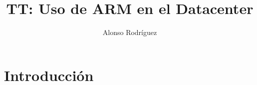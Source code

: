 \documentclass[a4paper,openright,12pt]{article}
\begin{document}
\author {Alonso Rodríguez}
\title {TT: Uso de ARM en el Datacenter}

\maketitle

\justifying{}

\section{Introducción}


\clearpage
\begin{flushleft}
\printbibliography[]{}
\end{flushleft}
\end{document}
